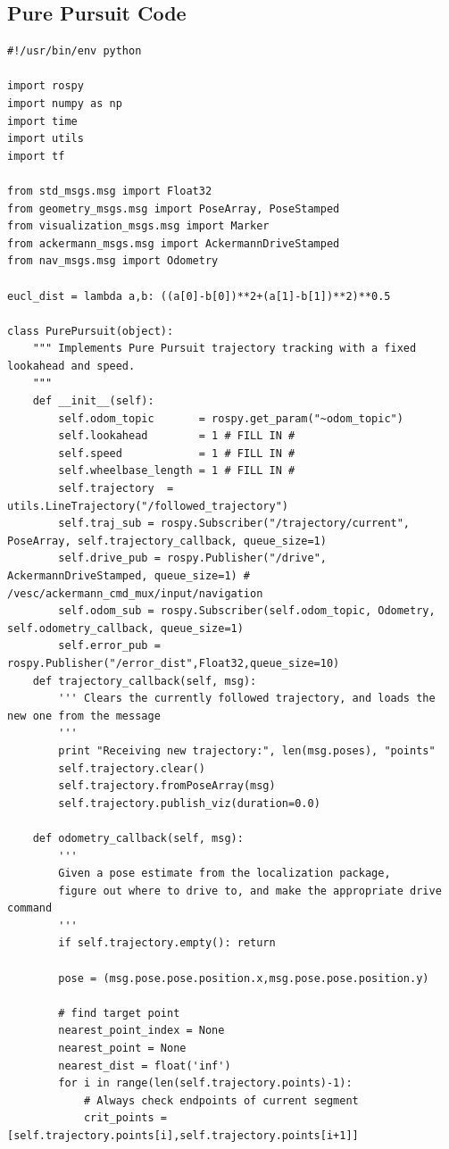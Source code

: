 \documentclass{article}
\begin{document}
\subsection{Pure Pursuit Code}
{\footnotesize
\begin{verbatim}
#!/usr/bin/env python

import rospy
import numpy as np
import time
import utils
import tf

from std_msgs.msg import Float32
from geometry_msgs.msg import PoseArray, PoseStamped
from visualization_msgs.msg import Marker
from ackermann_msgs.msg import AckermannDriveStamped
from nav_msgs.msg import Odometry

eucl_dist = lambda a,b: ((a[0]-b[0])**2+(a[1]-b[1])**2)**0.5

class PurePursuit(object):
    """ Implements Pure Pursuit trajectory tracking with a fixed lookahead and speed.
    """
    def __init__(self):
        self.odom_topic       = rospy.get_param("~odom_topic")
        self.lookahead        = 1 # FILL IN #
        self.speed            = 1 # FILL IN #
        self.wheelbase_length = 1 # FILL IN #
        self.trajectory  = utils.LineTrajectory("/followed_trajectory")
        self.traj_sub = rospy.Subscriber("/trajectory/current", PoseArray, self.trajectory_callback, queue_size=1)
        self.drive_pub = rospy.Publisher("/drive", AckermannDriveStamped, queue_size=1) # /vesc/ackermann_cmd_mux/input/navigation
        self.odom_sub = rospy.Subscriber(self.odom_topic, Odometry, self.odometry_callback, queue_size=1)
        self.error_pub = rospy.Publisher("/error_dist",Float32,queue_size=10)
    def trajectory_callback(self, msg):
        ''' Clears the currently followed trajectory, and loads the new one from the message
        '''
        print "Receiving new trajectory:", len(msg.poses), "points"
        self.trajectory.clear()
        self.trajectory.fromPoseArray(msg)
        self.trajectory.publish_viz(duration=0.0)

    def odometry_callback(self, msg):
        '''
        Given a pose estimate from the localization package,
        figure out where to drive to, and make the appropriate drive command
        '''
        if self.trajectory.empty(): return
        
        pose = (msg.pose.pose.position.x,msg.pose.pose.position.y)
        
        # find target point
        nearest_point_index = None
        nearest_point = None
        nearest_dist = float('inf')
        for i in range(len(self.trajectory.points)-1):
            # Always check endpoints of current segment
            crit_points = [self.trajectory.points[i],self.trajectory.points[i+1]]
            

\end{verbatim}}
\end{document}
